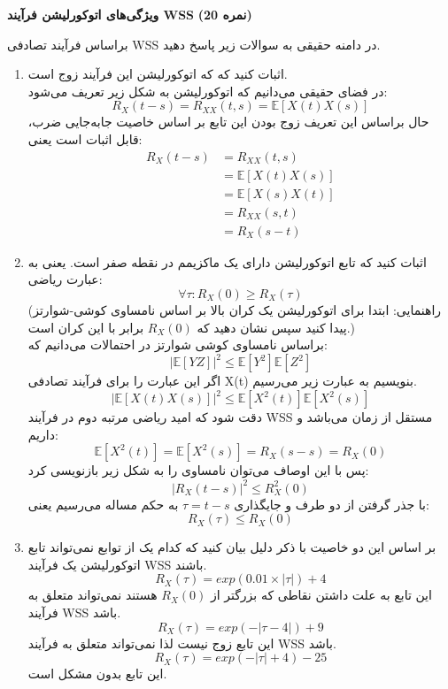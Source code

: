 \Large \textbf{ویژگی‌های اتوکورلیشن فرآیند WSS}
\large \textbf{(20 نمره)}

\normalsize \vspace{0.5cm}
براساس فرآیند تصادفی WSS در دامنه حقیقی به سوالات زیر پاسخ دهید.
\begin{enumerate}[label=(\alph*)]
	\item
اثبات کنید که که اتوکورلیشن این فرآیند زوج است.
\\
در فضای حقیقی می‌دانیم که اتوکورلیشن به شکل زیر تعریف می‌شود:
$$
R_X(t - s) = R_{XX}(t, s) = \mathbb{E}[X(t)X(s)]
$$
حال براساس این تعریف زوج بودن این تابع بر اساس خاصیت جابه‌جایی ضرب، قابل اثبات است یعنی:
\begin{align*}
	R_X(t - s) &= R_{XX}(t, s) \\
	&= \mathbb{E}[X(t)X(s)]\\
	&= \mathbb{E}[X(s)X(t)]\\
	&= R_{XX}(s, t)\\
	&= R_X(s - t)
\end{align*}
	\item
اثبات کنید که تابع اتوکورلیشن دارای یک ماکزیمم در نقطه صفر است. یعنی به عبارت ریاضی:
$$
\forall \tau : R_{X}(0) \geqslant R_X(\tau)
$$
(راهنمایی: ابتدا برای اتوکورلیشن یک کران بالا بر اساس نامساوی کوشی-شوارتز پیدا کنید سپس نشان دهید که 
$ R_X(0) $
برابر با این کران است.)
\\
براساس نامساوی کوشی شوارتز در احتمالات می‌دانیم که:
$$
|\mathbb{E}[YZ]|^2 \leqslant \mathbb{E}[Y^2]\mathbb{E}[Z^2]
$$
اگر این عبارت را برای فرآیند تصادفی X(t) بنویسیم به عبارت زیر می‌رسیم.
$$
|\mathbb{E}[X(t)X(s)]|^2 \leqslant \mathbb{E}[X^2(t)]\mathbb{E}[X^2(s)]
$$
دقت شود که امید ریاضی مرتبه دوم در فرآیند WSS مستقل از زمان می‌باشد و داریم:
$$
\mathbb{E}[X^2(t)] = \mathbb{E}[X^2(s)] = R_{X} (s - s) =  R_{X} (0) 
$$
پس با این اوصاف می‌توان نامساوی را به شکل زیر بازنویسی کرد:
$$
|R_X(t-s)|^2 \leqslant R_X^2 (0)
$$
با جذر گرفتن از دو طرف و جایگذاری 
$ \tau = t - s $
به حکم مساله می‌رسیم یعنی:
$$
R_X(\tau) \leqslant R_X (0)
$$
	\item 
بر اساس این دو خاصیت با ذکر دلیل بیان کنید که کدام یک از توابع نمی‌تواند تابع اتوکورلیشن یک فرآیند WSS باشند.
$$
R_X(\tau) = exp(0.01 \times |\tau|) + 4
$$
این تابع به علت داشتن نقاطی که بزرگتر از 
$ R_X(0)  $
هستند نمی‌تواند متعلق به فرآیند WSS باشد.
$$
R_X(\tau) = exp(-|\tau - 4|) + 9 
$$
این تابع زوج نیست لذا نمی‌تواند متعلق به فرآیند WSS باشد.
$$
R_X(\tau) = exp(-|\tau| + 4) - 25 
$$
این تابع بدون مشکل است.

\end{enumerate}


